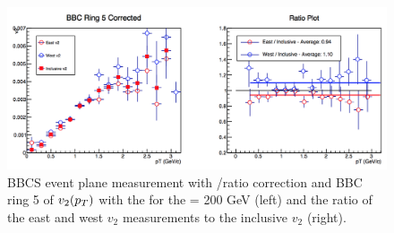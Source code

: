 \begin{figure}[!ht]
\centering
\includegraphics[width=0.65\linewidth]{figs/bbc_5_pp.png}
\caption{BBCS event plane measurement with \pp/\pau ratio correction and BBC ring 5 of $v_{2}(\mbox{$p_T$})$ with the  for the \pau \sqsn = 200 GeV (left) and the ratio of the east and west $v_2$ measurements to the inclusive $v_2$ (right).}
\end{figure}
